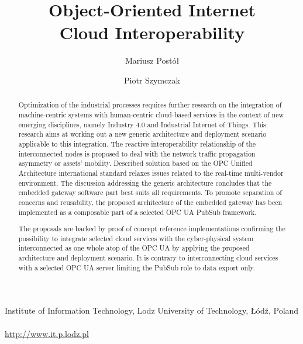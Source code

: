 \documentclass[runningheads]{llncs}
\begin{document}
\title{Object-Oriented Internet\\ Cloud Interoperability}

\author{Mariusz Postół  \and Piotr Szymczak }

\institute
{ Institute of Information Technology, Lodz University of Technology, Łódź, Poland \\
    \\
    \url{http://www.it.p.lodz.pl}
}

\maketitle              %


\begin{abstract}

    Optimization of the industrial processes requires further research on the integration of machine-centric systems with human-centric cloud-based services in the context of new emerging disciplines, namely Industry 4.0 and Industrial Internet of Things. This research aims at working out a new generic architecture and deployment scenario applicable to this integration. The reactive interoperability relationship of the interconnected nodes is proposed to deal with the network traffic propagation asymmetry or assets' mobility. Described solution based on the OPC Unified Architecture international standard relaxes issues related to the real-time multi-vendor environment. The discussion addressing the generic architecture concludes that the embedded gateway software part best suits all requirements. To promote separation of concerns and reusability, the proposed architecture of the embedded gateway has been implemented as a composable part of a selected OPC UA PubSub framework.

    The proposals are backed by proof of concept reference implementations confirming the possibility to integrate selected cloud services with the cyber-physical system interconnected as one whole atop of the OPC UA by applying the proposed architecture and deployment scenario. It is contrary to interconnecting cloud services with a selected OPC UA server limiting the PubSub role to data export only.


\end{abstract}
\end{document}

